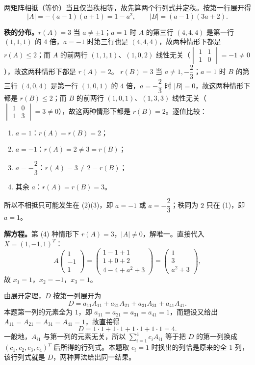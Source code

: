 \begin{solution}
两矩阵相抵（等价）当且仅当秩相等，故先算两个行列式并定秩。按第一行展开得
\[
|A|=-(a-1)(a+1)=1-a^2,\qquad |B|=(a-1)(3a+2).
\]

\textbf{秩的分布。}$r(A)=3$ 当 $a\ne\pm1$；$a=1$ 时 $A$ 的第三行 $(4,4,4)$ 是第一行 $(1,1,1)$ 的 $4$ 倍，$a=-1$ 时第三行也是 $(4,4,4)$，故两种情形下都是 $r(A)\le2$；而 $A$ 的前两行 $(1,1,1)$、$(1,0,2)$ 线性无关（$\begin{vmatrix}1&1\\1&0\end{vmatrix}=-1\ne0$），故这两种情形下都是 $r(A)=2$。
$r(B)=3$ 当 $a\ne1,-\dfrac23$；$a=1$ 时 $B$ 的第三行 $(4,0,4)$ 是第一行 $(1,0,1)$ 的 $4$ 倍，$a=-\dfrac23$ 时 $|B|=0$，故这两种情形下都是 $r(B)\le2$；而 $B$ 的前两行 $(1,0,1)$、$(1,3,3)$ 线性无关（$\begin{vmatrix}1&0\\1&3\end{vmatrix}=3\ne0$），故这两种情形下都是 $r(B)=2$。逐值比较：
\begin{enumerate}[label=(\arabic*),leftmargin=2.2em,itemsep=0.25em,topsep=0.3em]
\item $a=1$：$r(A)=r(B)=2$；
\item $a=-1$：$r(A)=2\ne3=r(B)$；
\item $a=-\dfrac23$：$r(A)=3\ne2=r(B)$；
\item 其余 $a$：$r(A)=r(B)=3$。
\end{enumerate}
所以不相抵只可能发生在 (2)(3)，即 $a=-1$ 或 $a=-\dfrac23$；秩同为 $2$ 只在 (1)，即 $a=1$。

\textbf{解方程。}第 (4) 种情形下 $r(A)=3$，$|A|\ne0$，解唯一。直接代入 $X=(1,-1,1)^{T}$：
\[
A\begin{pmatrix}1\\-1\\1\end{pmatrix}
=\begin{pmatrix}1-1+1\\1+0+2\\4-4+a^2+3\end{pmatrix}
=\begin{pmatrix}1\\3\\a^2+3\end{pmatrix},
\]
故 $x_1=1$，$x_2=-1$，$x_3=1$。
\end{solution}

\begin{solution}
由展开定理，$D$ 按第一列展开为
\[
D=a_{11}A_{11}+a_{21}A_{21}+a_{31}A_{31}+a_{41}A_{41}.
\]
本题第一列的元素全为 $1$，即 $a_{11}=a_{21}=a_{31}=a_{41}=1$，而题设又给出 $A_{11}=A_{21}=A_{31}=A_{41}=1$，故直接得
\[
D=1\cdot1+1\cdot1+1\cdot1+1\cdot1=4 .
\]
一般地，$A_{i1}$ 与第一列的元素无关，所以 $\displaystyle\sum_{i=1}^{4}c_iA_{i1}$ 等于把 $D$ 的第一列换成 $(c_1,c_2,c_3,c_4)^{T}$ 后所得的行列式。本题取 $c_i=1$ 时换出的列恰是原来的全 $1$ 列，该行列式就是 $D$，两种算法给出同一结果。
\end{solution}

